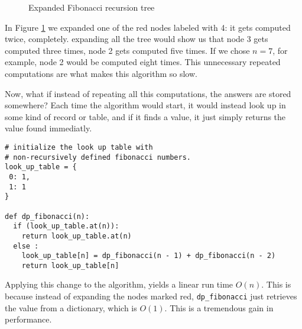 \begin{figure}[ht]
  \centering
  \caption{Expanded Fibonacci recursion tree}
  \label{fig:fib2}
\end{figure}

In Figure \ref{fig:fib2} we expanded one of the red nodes labeled with 4: it gets computed twice, completely.
expanding all the tree would show us that node 3 gets computed three times, node 2 gets computed five times.
If we chose $n = 7$, for example, node 2 would be computed eight times. This unnecessary repeated
computations are  what makes this algorithm so slow.

Now, what if instead of repeating all this computations, the answers are stored somewhere? Each
time the algorithm would start, it would instead look up in some kind of record or table, 
and if it finds a value, it just simply returns the value found immediatly.


\begin{verbatim}
# initialize the look up table with 
# non-recursively defined fibonacci numbers.
look_up_table = {
 0: 1,
 1: 1  
}

def dp_fibonacci(n):
  if (look_up_table.at(n)):
    return look_up_table.at(n)
  else :
    look_up_table[n] = dp_fibonacci(n - 1) + dp_fibonacci(n - 2)
    return look_up_table[n]
\end{verbatim}


Applying this change to the algorithm, yields a linear run time $O(n)$. This is because instead of expanding the
nodes marked red, \texttt{dp\_fibonacci} just retrieves the value from a dictionary, which is $O(1)$. This
is a tremendous gain in performance.


